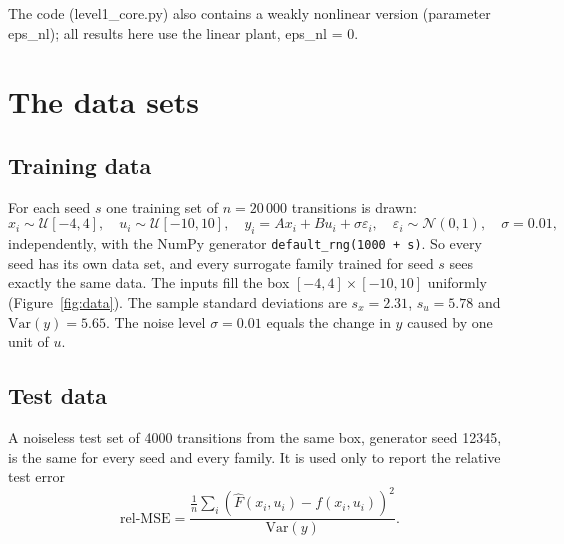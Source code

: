 \documentclass[11pt]{article}
\begin{document}
The code (level1\_core.py) also contains a weakly nonlinear version (parameter eps\_nl); all results here use the linear plant, eps\_nl = 0.

\section{The data sets}\label{sec:data}

\subsection{Training data}
For each seed $s$ one training set of $n=20\,000$ transitions is drawn:
\begin{equation}
x_i \sim \mathcal U[-4,4],\quad u_i \sim \mathcal U[-10,10],\quad y_i = A x_i + B u_i + \sigma \varepsilon_i,\quad \varepsilon_i\sim\mathcal N(0,1),\quad \sigma = 0.01,
\end{equation}
independently, with the NumPy generator \texttt{default\_rng(1000 + s)}. So every seed has its own data set, and every surrogate family trained for seed $s$ sees exactly the same data. The inputs fill the box $[-4,4]\times[-10,10]$ uniformly (Figure~\ref{fig:data}). The sample standard deviations are $s_x=2.31$, $s_u=5.78$ and $\mathrm{Var}(y)=5.65$. The noise level $\sigma=0.01$ equals the change in $y$ caused by one unit of $u$.

\subsection{Test data}
A noiseless test set of 4000 transitions from the same box, generator seed 12345, is the same for every seed and every family. It is used only to report the relative test error
\begin{equation}
\text{rel-MSE} = \frac{\frac{1}{n}\sum_i (\hat F(x_i,u_i)-f(x_i,u_i))^2}{\mathrm{Var}(y)} .
\end{equation}
\end{document}
